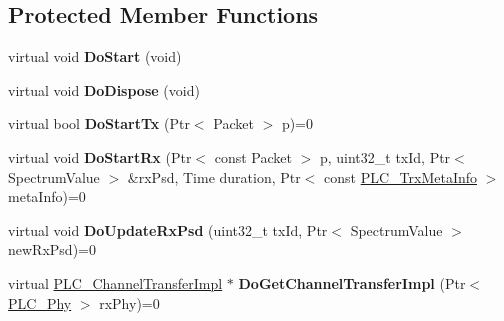 \subsection*{\-Protected \-Member \-Functions}
\begin{DoxyCompactItemize}
\item 
\hypertarget{classns3_1_1PLC__Phy_a614fcc21473fed15ea0a56f86a0e3628}{virtual void {\bfseries \-Do\-Start} (void)}\label{classns3_1_1PLC__Phy_a614fcc21473fed15ea0a56f86a0e3628}

\item 
\hypertarget{classns3_1_1PLC__Phy_a5654398d73868f256bd338a5bd64229f}{virtual void {\bfseries \-Do\-Dispose} (void)}\label{classns3_1_1PLC__Phy_a5654398d73868f256bd338a5bd64229f}

\item 
\hypertarget{classns3_1_1PLC__Phy_a29adea495ce0dfd3299766982ed5b0fe}{virtual bool {\bfseries \-Do\-Start\-Tx} (\-Ptr$<$ \-Packet $>$ p)=0}\label{classns3_1_1PLC__Phy_a29adea495ce0dfd3299766982ed5b0fe}

\item 
\hypertarget{classns3_1_1PLC__Phy_a46b98bd3de07f51cfa53af58fa20f1cd}{virtual void {\bfseries \-Do\-Start\-Rx} (\-Ptr$<$ const \-Packet $>$ p, uint32\-\_\-t tx\-Id, \-Ptr$<$ \-Spectrum\-Value $>$ \&rx\-Psd, \-Time duration, \-Ptr$<$ const \hyperlink{classns3_1_1PLC__TrxMetaInfo}{\-P\-L\-C\-\_\-\-Trx\-Meta\-Info} $>$ meta\-Info)=0}\label{classns3_1_1PLC__Phy_a46b98bd3de07f51cfa53af58fa20f1cd}

\item 
\hypertarget{classns3_1_1PLC__Phy_ad2137025b97803e834683d9a1eed897e}{virtual void {\bfseries \-Do\-Update\-Rx\-Psd} (uint32\-\_\-t tx\-Id, \-Ptr$<$ \-Spectrum\-Value $>$ new\-Rx\-Psd)=0}\label{classns3_1_1PLC__Phy_ad2137025b97803e834683d9a1eed897e}

\item 
\hypertarget{classns3_1_1PLC__Phy_ac539a2e014f1ed6a532ee79e7e4f1ea0}{virtual \hyperlink{classns3_1_1PLC__ChannelTransferImpl}{\-P\-L\-C\-\_\-\-Channel\-Transfer\-Impl} $\ast$ {\bfseries \-Do\-Get\-Channel\-Transfer\-Impl} (\-Ptr$<$ \hyperlink{classns3_1_1PLC__Phy}{\-P\-L\-C\-\_\-\-Phy} $>$ rx\-Phy)=0}\label{classns3_1_1PLC__Phy_ac539a2e014f1ed6a532ee79e7e4f1ea0}

\end{DoxyCompactItemize}
